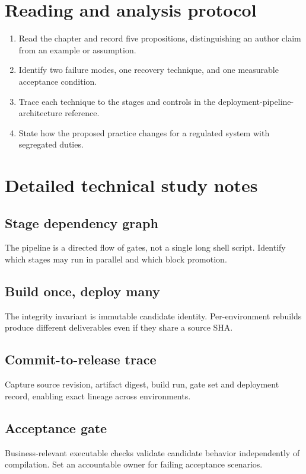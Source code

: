 \documentclass[10pt,letterpaper]{article}
\begin{document}
\section{Reading and analysis protocol}
\begin{enumerate}
\item Read the chapter and record five propositions, distinguishing an author claim from an example or assumption.
\item Identify two failure modes, one recovery technique, and one measurable acceptance condition.
\item Trace each technique to the stages and controls in the deployment-pipeline-architecture reference.
\item State how the proposed practice changes for a regulated system with segregated duties.
\end{enumerate}

\section{Detailed technical study notes}
\subsection{Stage dependency graph}
The pipeline is a directed flow of gates, not a single long shell script. Identify which stages may run in parallel and which block promotion.

\subsection{Build once, deploy many}
The integrity invariant is immutable candidate identity. Per-environment rebuilds produce different deliverables even if they share a source SHA.

\subsection{Commit-to-release trace}
Capture source revision, artifact digest, build run, gate set and deployment record, enabling exact lineage across environments.

\subsection{Acceptance gate}
Business-relevant executable checks validate candidate behavior independently of compilation. Set an accountable owner for failing acceptance scenarios.
\end{document}
